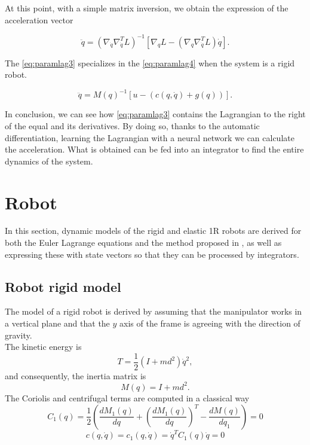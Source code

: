 \documentclass[a4paper]{article}
\begin{document}
At this point, with a simple matrix inversion, we obtain the expression of the acceleration vector

\begin{equation}
    \label{eq:paramlag3}
    \ddot{q} = (\nabla_{\dot{q}}\nabla_{\dot{q}}^T L)^{-1} [\nabla_{q} L - (\nabla_{q}\nabla_{\dot{q}}^T L)\dot{q}].
\end{equation}

The \eqref{eq:paramlag3} specializes in the \eqref{eq:paramlag4} when the system is a rigid robot.

\begin{equation}
    \label{eq:paramlag4}
    \ddot{q} = M(q)^{-1}[u - (c(q,\dot{q}) + g(q))].
\end{equation}

In conclusion, we can see how \eqref{eq:paramlag3} contains the Lagrangian to the right of the equal and its derivatives. By doing so, thanks to the automatic differentiation, learning the Lagrangian with a neural network we can calculate the acceleration. What is obtained can be fed into an integrator to find the entire dynamics of the system.


\section{Robot}
\label{sec:robot}
In this section, dynamic models of the rigid and elastic 1R robots are derived for both the Euler Lagrange equations and the method proposed in \cite{lnncranmer}, as well as expressing these with state vectors so that they can be processed by integrators.

\subsection{Robot rigid model}
The model of a rigid robot is derived by assuming that the manipulator works in a vertical plane and that the $y$ axis of the frame is agreeing with the direction of gravity.\\
The kinetic energy is
\begin{equation}
    \nonumber
    T = \frac{1}{2}(I+md^2)\dot{q}^2,
\end{equation}
and consequently, the inertia matrix is
\begin{equation}
    M(q)=I+md^2.
\end{equation}
The Coriolis and centrifugal terms are computed in a classical way
\begin{equation}
    \nonumber
    C_1(q)=\frac{1}{2}(\frac{dM_1(q)}{dq}+(\frac{dM_1(q)}{dq})^T-\frac{dM(q)}{dq_1})=0
\end{equation}
\begin{equation}
    \nonumber
    c(q,\dot{q})=c_1(q,\dot{q})=\dot{q}^TC_1(q)\dot{q}=0
\end{equation}
\end{document}
